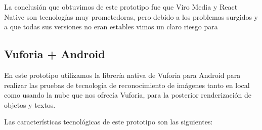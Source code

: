 La conclusión que obtuvimos de este prototipo fue que Viro Media y React Native son tecnologías muy prometedoras, pero debido a los
 problemas surgidos y a que todas sus versiones no eran estables vimos un claro riesgo para

\subsection{Vuforia + Android} 
\label{makereference3.6.3} 
 
En este prototipo utilizamos la librería nativa de Vuforia para Android para 
realizar las pruebas de tecnología de reconocimiento de imágenes tanto en  
local como usando la nube que nos ofrecía Vuforia, para la posterior renderización
de objetos y textos.

Las características tecnológicas de este prototipo son las siguientes:


